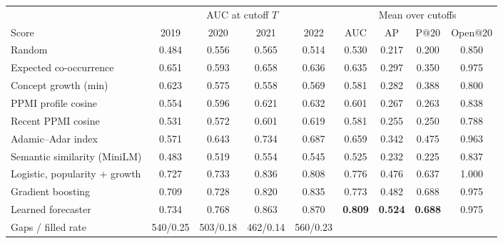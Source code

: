 \begin{tabular}{lcccccccc}
\toprule
 & \multicolumn{4}{c}{AUC at cutoff $T$} & \multicolumn{4}{c}{Mean over cutoffs}\\
\cmidrule(lr){2-5}\cmidrule(lr){6-9}
Score & 2019 & 2020 & 2021 & 2022 & AUC & AP & P@20 & Open@20\\
\midrule
Random & 0.484 & 0.556 & 0.565 & 0.514 & 0.530 & 0.217 & 0.200 & 0.850\\
Expected co-occurrence & 0.651 & 0.593 & 0.658 & 0.636 & 0.635 & 0.297 & 0.350 & 0.975\\
Concept growth (min) & 0.623 & 0.575 & 0.558 & 0.569 & 0.581 & 0.282 & 0.388 & 0.800\\
PPMI profile cosine & 0.554 & 0.596 & 0.621 & 0.632 & 0.601 & 0.267 & 0.263 & 0.838\\
Recent PPMI cosine & 0.531 & 0.572 & 0.601 & 0.619 & 0.581 & 0.255 & 0.250 & 0.788\\
Adamic--Adar index & 0.571 & 0.643 & 0.734 & 0.687 & 0.659 & 0.342 & 0.475 & 0.963\\
Semantic similarity (MiniLM) & 0.483 & 0.519 & 0.554 & 0.545 & 0.525 & 0.232 & 0.225 & 0.837\\
\midrule
Logistic, popularity + growth & 0.727 & 0.733 & 0.836 & 0.808 & 0.776 & 0.476 & 0.637 & 1.000\\
Gradient boosting & 0.709 & 0.728 & 0.820 & 0.835 & 0.773 & 0.482 & 0.688 & 0.975\\
\midrule
Learned forecaster & 0.734 & 0.768 & 0.863 & 0.870 & \textbf{0.809} & \textbf{0.524} & \textbf{0.688} & 0.975\\
\midrule
Gaps / filled rate & 540/0.25 & 503/0.18 & 462/0.14 & 560/0.23 & \multicolumn{4}{c}{}\\
\bottomrule
\end{tabular}